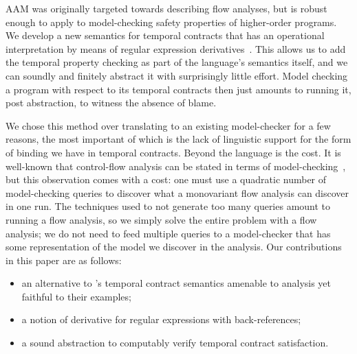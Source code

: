 AAM was originally targeted towards describing flow analyses, but is robust enough to apply to model-checking safety properties of higher-order programs.
%
We develop a new semantics for temporal contracts that has an operational interpretation by means of regular expression derivatives~\citep{ianjohnson:Brzozowski1964}.
%
This allows us to add the temporal property checking as part of the language's semantics itself, and we can soundly and finitely abstract it with surprisingly little effort.
%
Model checking a program with respect to its temporal contracts then just amounts to running it, post abstraction, to witness the absence of blame.

We chose this method over translating to an existing model-checker for a few reasons, the most important of which is the lack of linguistic support for the form of binding we have in temporal contracts.
%
Beyond the language is the cost.
%
It is well-known that control-flow analysis can be stated in terms of model-checking~\citep{ianjohnson:analysis-is-mc}, but this observation comes with a cost: one must use a quadratic number of model-checking queries to discover what a monovariant flow analysis can discover in one run.
%
The techniques used to not generate too many queries amount to running a flow analysis, so we simply solve the entire problem with a flow analysis; we do not need to feed multiple queries to a model-checker that has some representation of the model we discover in the analysis.
%
Our contributions in this paper are as follows:
\begin{itemize}
 \item{an alternative to \dfm's temporal contract semantics amenable to analysis yet faithful to their examples;}
 \item{a notion of derivative for regular expressions with back-references;}
 \item{a sound abstraction to computably verify temporal contract satisfaction.}
\end{itemize}

